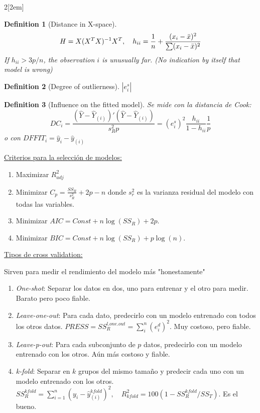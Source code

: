 \documentclass[leqno]{article}
\newtheorem*{definition}{Definition}
\begin{document}
\begin{multicols}{2}[\columnsep2em]
\begin{definition}[Distance in X-space]
\[
H = X(X^TX)^{-1}X^T, \quad h_{ii} = \frac{1}{n} + \frac{(x_i-\Bar{x})^2}{\sum (x_i-\Bar{x})^2}
\]
If $h_{ii}>3p/n$, the observation $i$ is unusually far. (No indication by itself that model is wrong)
\end{definition}

\begin{definition}[Degree of outlierness]
$|e_i^s|$
\end{definition}

\begin{definition}[Influence on the fitted model]
Se mide con la distancia de Cook:
\[
DC_i = \frac{(\hat Y - \hat Y_{(i)})'(\hat Y - \hat Y_{(i)})}{s_R^2p} = (e_i^s)^2\frac{h_{ii}}{1-h_{ii}}\frac{1}{p}
\]
o con $DFFIT_i = \hat y_i - \hat y_{(i)}$
\end{definition}


\underline{Criterios para la selección de modelos:}
\begin{enumerate}
    \item Maximizar $R^2_{adj}$
    \item Minimizar $C_p = \frac{SS_R}{s_R^2}+2p-n$ donde $s_r^2$ es la varianza residual del modelo con todas las variables.
    \item Minimizar $AIC = Const + n\log(SS_R)+2p$.
    \item Minimizar $BIC = Const + n\log(SS_R)+p\log(n)$.
\end{enumerate}

\underline{Tipos de cross validation:}

Sirven para medir el rendimiento del modelo más "honestamente"
\begin{enumerate}
    \item \textit{One-shot}: Separar los datos en dos, uno para entrenar y el otro para medir. Barato pero poco fiable.
    \item \textit{Leave-one-out}: Para cada dato, predecirlo con un modelo entrenado con todos los otros datos. $PRESS = SS_R^{l.one.out} = \sum_i^n (e_i^d)^2$. Muy costoso, pero fiable.
    \item \textit{Leave-p-out}: Para cada subconjunto de $p$ datos, predecirlo con un modelo entrenado con los otros. Aún más costoso y fiable.
    \item \textit{k-fold}: Separar en $k$ grupos del mismo tamaño y predecir cada uno con un modelo entrenado con los otros. $SS_R^{kfold} = \sum_{i=1}^n (y_i - \hat y_{(i)}^{kfold})^2, \quad R_{kfold}^2 = 100(1-SS_R^{kfold}/SS_T)$. Es el bueno.
\end{enumerate}


\end{multicols}
\end{document}
